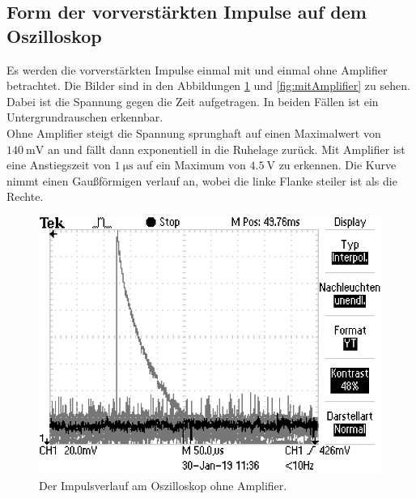 \subsection{Form der vorverstärkten Impulse auf dem Oszilloskop}

Es werden die vorverstärkten Impulse einmal mit und einmal ohne Amplifier betrachtet. Die Bilder sind in den Abbildungen \ref{fig:ohneAmplifier} und \ref{fig:mitAmplifier} zu sehen. Dabei ist die Spannung gegen die Zeit aufgetragen. In beiden Fällen ist ein Untergrundrauschen erkennbar.\\
Ohne Amplifier steigt die Spannung sprunghaft auf einen Maximalwert von $\SI{140}{\milli\volt}$ an und fällt dann exponentiell in die Ruhelage zurück.
Mit Amplifier ist eine Anstiegszeit von $\SI{1}{\micro\second}$ auf ein Maximum von $\SI{4,5}{\volt}$ zu erkennen. Die Kurve nimmt einen Gaußförmigen verlauf an, wobei die linke Flanke steiler ist als die Rechte.\\

\begin{figure}
	\centering
	\includegraphics[width=\linewidth-60pt,keepaspectratio]{content/images/ohneVerstaerker02.jpg}
	\caption{Der Impulsverlauf am Oszilloskop ohne Amplifier.}
	\label{fig:ohneAmplifier}
\end{figure}

